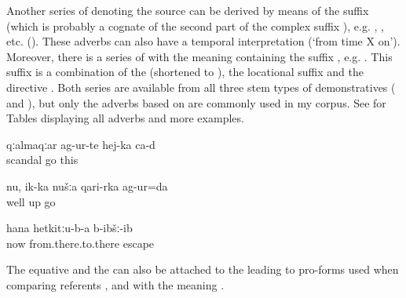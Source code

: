 Another series of  denoting the source can be derived by means of the suffix  (which is probably a cognate of the second part of the complex  suffix ), e.g.  ,  , etc. (). These adverbs can also have a temporal interpretation (`from time X on'). Moreover, there is a series of  with the meaning  containing the suffix , e.g.   . This suffix is a combination of the   (shortened to ), the locational suffix  and the directive . Both series are available from all three stem types of demonstratives (  and ), but only the adverbs based on  are commonly used in my corpus. See  for Tables displaying all adverbs and more examples. 
%
\begin{exe}
	\ex	\label{ex:From here the scandal happened}
	\gll	qːalmaqːar	ag-ur-te	hej-ka	ca-d\\
		scandal	go 	this	\\
	\glt	{}

	\ex	\label{ex:Well we went from up there along the upper side}
	\gll	nu,	ik-ka	nušːa	qari-rka	ag-ur=da\\
		well			up	go\\
	\glt	{}

	\ex	\label{ex:(The dog) ran away to that side (from there to there)}
	\gll	hana	hetkitːu-b-a	b-ibšː-ib\\
		now	from.there.to.there	escape\\
	\glt	{}
\end{exe}
%
The equative    and the    can also be attached to the  leading to pro-forms used when comparing referents ,  and  with the meaning  .


